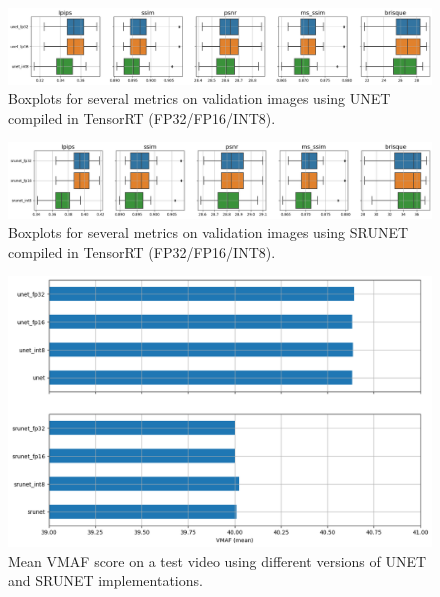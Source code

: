 \begin{figure}[h]
\includegraphics[width=1.0\textwidth]{static/2023_03_02_boxplots_metrics_quant_UNet.png}
\caption{Boxplots for several metrics on validation images using UNET compiled in TensorRT (FP32/FP16/INT8).}
\label{fig:timings-unet}
\end{figure}

\begin{figure}[h]
\includegraphics[width=1.0\textwidth]{static/2023_03_02_boxplots_metrics_quant_SRUNET.png}
\caption{Boxplots for several metrics on validation images using SRUNET compiled in TensorRT (FP32/FP16/INT8).}
\label{fig:timings-srunet}
\end{figure}

\begin{figure}[h]
\includegraphics[width=1.0\textwidth]{static/2023_03_17_barplot_vmaf_mean.png}
\caption{Mean VMAF score on a test video using different versions of UNET and SRUNET implementations.}
\label{fig:vmaf-mean}
\end{figure}

